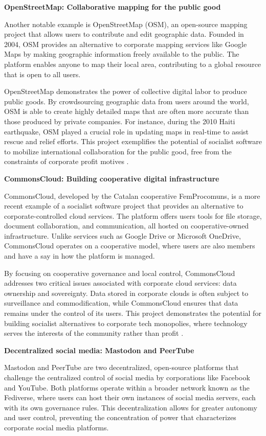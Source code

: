 \begin{refsection}
\textbf{OpenStreetMap: Collaborative mapping for the public good}

Another notable example is OpenStreetMap (OSM), an open-source mapping project that allows users to contribute and edit geographic data. Founded in 2004, OSM provides an alternative to corporate mapping services like Google Maps by making geographic information freely available to the public. The platform enables anyone to map their local area, contributing to a global resource that is open to all users.

OpenStreetMap demonstrates the power of collective digital labor to produce public goods. By crowdsourcing geographic data from users around the world, OSM is able to create highly detailed maps that are often more accurate than those produced by private companies. For instance, during the 2010 Haiti earthquake, OSM played a crucial role in updating maps in real-time to assist rescue and relief efforts. This project exemplifies the potential of socialist software to mobilize international collaboration for the public good, free from the constraints of corporate profit motives \cite[pp.~29-32]{reagle_wikipedia}.

\textbf{CommonsCloud: Building cooperative digital infrastructure}

CommonsCloud, developed by the Catalan cooperative FemProcomuns, is a more recent example of a socialist software project that provides an alternative to corporate-controlled cloud services. The platform offers users tools for file storage, document collaboration, and communication, all hosted on cooperative-owned infrastructure. Unlike services such as Google Drive or Microsoft OneDrive, CommonsCloud operates on a cooperative model, where users are also members and have a say in how the platform is managed.

By focusing on cooperative governance and local control, CommonsCloud addresses two critical issues associated with corporate cloud services: data ownership and sovereignty. Data stored in corporate clouds is often subject to surveillance and commodification, while CommonsCloud ensures that data remains under the control of its users. This project demonstrates the potential for building socialist alternatives to corporate tech monopolies, where technology serves the interests of the community rather than profit \cite[pp.~45-50]{schumacher_small}.

\textbf{Decentralized social media: Mastodon and PeerTube}

Mastodon and PeerTube are two decentralized, open-source platforms that challenge the centralized control of social media by corporations like Facebook and YouTube. Both platforms operate within a broader network known as the Fediverse, where users can host their own instances of social media servers, each with its own governance rules. This decentralization allows for greater autonomy and user control, preventing the concentration of power that characterizes corporate social media platforms.


\end{refsection}
